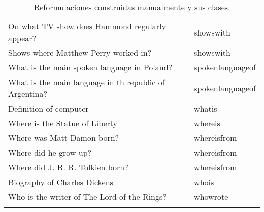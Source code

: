 \begin{longtable}{l l}
On what TV show does Hammond regularly appear? & showswith \\
Shows where Matthew Perry worked in? & showswith \\
What is the main spoken language in Poland? & spokenlanguageof \\
What is the main language in th republic of Argentina? & spokenlanguageof \\
Definition of computer & whatis \\
Where is the Statue of Liberty & whereis \\
Where was Matt Damon born? & whereisfrom \\
Where did he grow up? & whereisfrom \\
Where did J. R. R. Tolkien born? & whereisfrom \\
Biography of Charles Dickens & whois \\
Who is the writer of The Lord of the Rings? & whowrote \\
\hline
\caption{Reformulaciones construidas manualmente y sus clases.}
\end{longtable}
